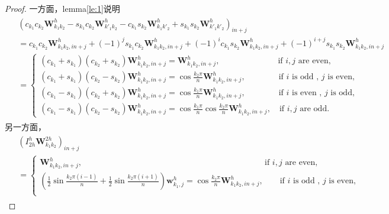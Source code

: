 \documentclass[a4paper,twoside]{ctexart}
\begin{document}
  \begin{proof}
    一方面，lemma\ref{le:1}说明
    \begin{eqnarray}
    \begin{aligned}
      &\left(c_{k_1}c_{k_2}\mathbf{W}_{k_1
        k_2}^{h}-s_{k_1}c_{k_2}\mathbf{W}_{k'_1
        k_2}^h-c_{k_1}s_{k_2}\mathbf{W}_{k_1
        k'_2}^h+s_{k_1}s_{k_2}\mathbf{W}_{k'_1 k'_2}^h\right)_{in+j}\\
      &=c_{k_1}c_{k_2}\mathbf{W}_{k_1
        k_2,in+j}^h+(-1)^js_{k_1}c_{k_2}\mathbf{W}_{k_1
        k_2,in+j}^h+(-1)^ic_{k_1}s_{k_2}\mathbf{W}_{k_1
        k_2,in+j}^h+(-1)^{i+j}s_{k_1}s_{k_2}\mathbf{W}_{k_1 k_2,in+j}^h\\
      &=\begin{cases}
        (c_{k_1}+s_{k_1})(c_{k_2}+s_{k_2})\mathbf{W}_{k_1 k_2,in+j}^h =
        \mathbf{W}_{k_1 k_2,in+j}^h, \qquad \qquad \qquad \quad \text{if }i,j\text{ are even},\\
        (c_{k_1}+s_{k_1})(c_{k_2}-s_{k_2})\mathbf{W}_{k_1 k_2,in+j}^h =
        \cos{\frac{k_2\pi}{n}}\mathbf{W}_{k_1 k_2,in+j}^h, \qquad \qquad \text{if } i
          \text{ is odd , }j\text{ is even},\\
        (c_{k_1}-s_{k_1})(c_{k_2}+s_{k_2})\mathbf{W}_{k_1 k_2,in+j}^h =
        \cos{\frac{k_1\pi}{n}}\mathbf{W}_{k_1 k_2,in+j}^h, \qquad \qquad \text{if } i
          \text{ is even , }j\text{ is odd},\\
          (c_{k_1}-s_{k_1})(c_{k_2}-s_{k_2})\mathbf{W}_{k_1 k_2,in+j}^h =
        \cos{\frac{k_1\pi}{n}}\cos{\frac{k_2\pi}{n}}\mathbf{W}_{k_1 k_2,in+j}^h, \quad \text{if }i,j\text{ are odd}.
      \end{cases}
    \end{aligned}
    \end{eqnarray}
    另一方面，
     \begin{eqnarray}
    \begin{aligned}
      &\left(I_{2h}^h\mathbf{W}_{k_1 k_2}^{2h}\right)_{in+j}\\
      &= \begin{cases}
        \mathbf{W}_{k_1 k_2,in+j}^h, \qquad \qquad \qquad \qquad \qquad\qquad \qquad \qquad \qquad \qquad \qquad\text{if }i,j\text{ are even},\\
        (\frac{1}{2}\sin{\frac{k_2\pi(i-1)}{n}}+\frac{1}{2}\sin{\frac{k_2\pi(i+1)}{n}})\mathbf{w}_{k_1,j}^h =
        \cos{\frac{k_2\pi}{n}}\mathbf{W}_{k_1 k_2,in+j}^h,\qquad  \text{if } i
          \text{ is odd , }j\text{ is even},\\

\end{cases}
\end{aligned}
\end{eqnarray}
\end{proof}
\end{document}
